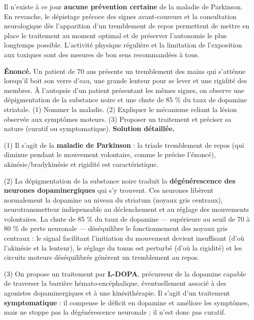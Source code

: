 \documentclass[11pt]{article}
\newcommand{\cle}[1]{{\popxbold\color{popdark}#1}}
\begin{document}
Il n'existe à ce jour \textbf{aucune prévention certaine} de la maladie de Parkinson. En revanche, le \cle{dépistage précoce} des signes avant-coureurs et la consultation neurologique dès l'apparition d'un tremblement de repos permettent de mettre en place le traitement au moment optimal et de préserver l'autonomie le plus longtemps possible. L'activité physique régulière et la limitation de l'exposition aux toxiques sont des mesures de bon sens recommandées à tous.

\begin{exoresolu}
\textbf{Énoncé.} Un patient de 70 ans présente un tremblement des mains qui s'atténue lorsqu'il boit son verre d'eau, une grande lenteur pour se lever et une rigidité des membres. À l'autopsie d'un patient présentant les mêmes signes, on observe une dépigmentation de la substance noire et une chute de 85 \% du taux de dopamine striatale. (1) Nommer la maladie. (2) Expliquer le mécanisme reliant la lésion observée aux symptômes moteurs. (3) Proposer un traitement et préciser sa nature (curatif ou symptomatique).
\tcblower
\textbf{Solution détaillée.}

(1) Il s'agit de la \textbf{maladie de Parkinson} : la triade tremblement de repos (qui diminue pendant le mouvement volontaire, comme le précise l'énoncé), akinésie/bradykinésie et rigidité est caractéristique.

(2) La dépigmentation de la substance noire traduit la \textbf{dégénérescence des neurones dopaminergiques} qui s'y trouvent. Ces neurones libèrent normalement la dopamine au niveau du striatum (noyaux gris centraux), neurotransmetteur indispensable au déclenchement et au réglage des mouvements volontaires. La chute de 85 \% du taux de dopamine — supérieure au seuil de 70 à 80 \% de perte neuronale — déséquilibre le fonctionnement des noyaux gris centraux : le signal facilitant l'initiation du mouvement devient insuffisant (d'où l'akinésie et la lenteur), le réglage du tonus est perturbé (d'où la rigidité) et les circuits moteurs déséquilibrés génèrent un tremblement au repos.

(3) On propose un traitement par \textbf{L-DOPA}, précurseur de la dopamine capable de traverser la barrière hémato-encéphalique, éventuellement associé à des agonistes dopaminergiques et à une kinésithérapie. Il s'agit d'un traitement \textbf{symptomatique} : il compense le déficit en dopamine et améliore les symptômes, mais ne stoppe pas la dégénérescence neuronale ; il n'est donc pas curatif.
\end{exoresolu}
\end{document}
